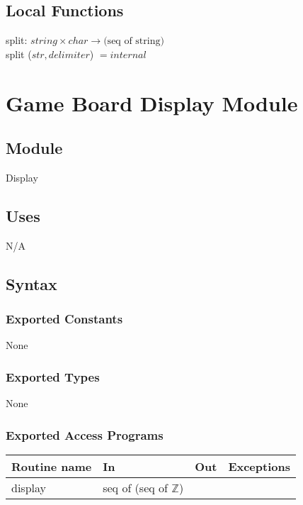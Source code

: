 \documentclass[12pt]{article}
\begin{document}
\subsection*{Local Functions}

\noindent split: $string \times char \rightarrow \mbox{(seq of string)}$\\
\noindent split ($str, delimiter$) $= internal$ \\



\newpage

\section* {Game Board Display Module}

\subsection*{Module}

Display

\subsection* {Uses}

N/A

\subsection* {Syntax}

\subsubsection* {Exported Constants}

None

\subsubsection* {Exported Types}

None

\subsubsection* {Exported Access Programs}

\begin{tabular}{| l | l | l | l |}
\hline
\textbf{Routine name} & \textbf{In} & \textbf{Out} & \textbf{Exceptions}\\
\hline
display & seq of (seq of $\mathbb{Z}$) & ~ & ~\\
\hline
\end{tabular}
\end{document}

